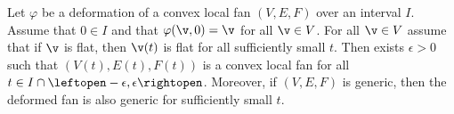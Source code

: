 \begin{lemma}[]\label{lemma:fan-open}
Let $\varphi$ be a deformation of a convex local fan $(V,E,F)$ over an
interval $I$.  Assume that $0\in I$ and that $\varphi(\v,0)=\v$ for
all $\v\in V$.  For all $\v\in V$ assume that if
$\v$ is flat, then $\v(t)$ is flat for all sufficiently small $t$.
Then exists $\epsilon>0$ such that $(V(t),E(t),F(t))$ is a convex local fan
for all $t\in I\cap \leftopen-\epsilon,\epsilon\rightopen$.  
Moreover,  if $(V,E,F)$ is
generic, then the deformed fan is also generic for sufficiently small
$t$.
\end{lemma}

